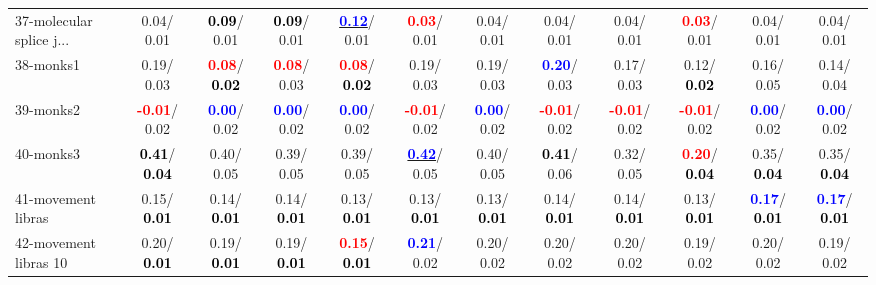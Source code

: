 \begin{table}[h]
\begin{center}
{\begin{tabular}{lc|c|c|c|c|c|c|c|c|c|c}
37-molecular splice j... &   0.04/  0.01 & \textcolor{black}{\textbf{  0.09}}/  0.01 & \textcolor{black}{\textbf{  0.09}}/  0.01 & \underline{\textcolor{blue}{\textbf{  0.12}}}/  0.01 & \textcolor{red}{\textbf{  0.03}}/  0.01 &   0.04/  0.01 &   0.04/  0.01 &   0.04/  0.01 & \textcolor{red}{\textbf{  0.03}}/  0.01 &   0.04/  0.01 &   0.04/  0.01 \\
38-monks1 &   0.19/  0.03 & \textcolor{red}{\textbf{  0.08}}/\textcolor{black}{\textbf{  0.02}} & \textcolor{red}{\textbf{  0.08}}/  0.03 & \textcolor{red}{\textbf{  0.08}}/\textcolor{black}{\textbf{  0.02}} &   0.19/  0.03 &   0.19/  0.03 & \textcolor{blue}{\textbf{  0.20}}/  0.03 &   0.17/  0.03 &   0.12/\textcolor{black}{\textbf{  0.02}} &   0.16/  0.05 &   0.14/  0.04 \\
39-monks2 & \textcolor{red}{\textbf{ -0.01}}/  0.02 & \textcolor{blue}{\textbf{  0.00}}/  0.02 & \textcolor{blue}{\textbf{  0.00}}/  0.02 & \textcolor{blue}{\textbf{  0.00}}/  0.02 & \textcolor{red}{\textbf{ -0.01}}/  0.02 & \textcolor{blue}{\textbf{  0.00}}/  0.02 & \textcolor{red}{\textbf{ -0.01}}/  0.02 & \textcolor{red}{\textbf{ -0.01}}/  0.02 & \textcolor{red}{\textbf{ -0.01}}/  0.02 & \textcolor{blue}{\textbf{  0.00}}/  0.02 & \textcolor{blue}{\textbf{  0.00}}/  0.02 \\ \hline
40-monks3 & \textcolor{black}{\textbf{  0.41}}/\textcolor{black}{\textbf{  0.04}} &   0.40/  0.05 &   0.39/  0.05 &   0.39/  0.05 & \underline{\textcolor{blue}{\textbf{  0.42}}}/  0.05 &   0.40/  0.05 & \textcolor{black}{\textbf{  0.41}}/  0.06 &   0.32/  0.05 & \textcolor{red}{\textbf{  0.20}}/\textcolor{black}{\textbf{  0.04}} &   0.35/\textcolor{black}{\textbf{  0.04}} &   0.35/\textcolor{black}{\textbf{  0.04}} \\
41-movement libras &   0.15/\textcolor{black}{\textbf{  0.01}} &   0.14/\textcolor{black}{\textbf{  0.01}} &   0.14/\textcolor{black}{\textbf{  0.01}} &   0.13/\textcolor{black}{\textbf{  0.01}} &   0.13/\textcolor{black}{\textbf{  0.01}} &   0.13/\textcolor{black}{\textbf{  0.01}} &   0.14/\textcolor{black}{\textbf{  0.01}} &   0.14/\textcolor{black}{\textbf{  0.01}} &   0.13/\textcolor{black}{\textbf{  0.01}} & \textcolor{blue}{\textbf{  0.17}}/\textcolor{black}{\textbf{  0.01}} & \textcolor{blue}{\textbf{  0.17}}/\textcolor{black}{\textbf{  0.01}} \\
42-movement libras 10 &   0.20/\textcolor{black}{\textbf{  0.01}} &   0.19/\textcolor{black}{\textbf{  0.01}} &   0.19/\textcolor{black}{\textbf{  0.01}} & \textcolor{red}{\textbf{  0.15}}/\textcolor{black}{\textbf{  0.01}} & \textcolor{blue}{\textbf{  0.21}}/  0.02 &   0.20/  0.02 &   0.20/  0.02 &   0.20/  0.02 &   0.19/  0.02 &   0.20/  0.02 &   0.19/  0.02 \\

\end{tabular}}
\end{center}
\end{table}

